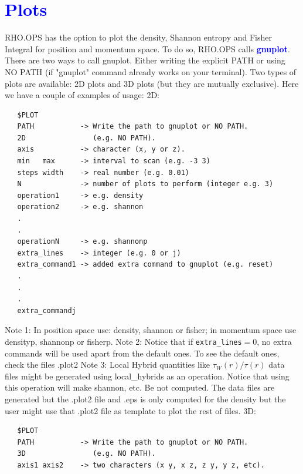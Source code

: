 \documentclass[10pt,a4paper]{article}
\newcommand{\tbl}[1]{{\textcolor{blue}{#1}}}
\begin{document}
{\section{\tbl{\textbf{Plots}}}
\noindent RHO.OPS has the option to plot the density, Shannon entropy and Fisher Integral for position and momentum space. To do so, RHO.OPS calls {\tbl{\textbf{gnuplot}}}. There are two ways to call gnuplot. Either writing the explicit PATH or using NO PATH (if "gnuplot" command already works on your terminal). Two types of plots are available: 2D plots and 3D plots (but they are mutually exclusive). Here we have a couple of examples of usage:
\newline
\newline
\noindent 2D: \newline
\begin{verbatim}
   $PLOT
   PATH           -> Write the path to gnuplot or NO PATH.
   2D                (e.g. NO PATH).
   axis           -> character (x, y or z).
   min   max      -> interval to scan (e.g. -3 3)
   steps width    -> real number (e.g. 0.01)
   N              -> number of plots to perform (integer e.g. 3)
   operation1     -> e.g. density
   operation2     -> e.g. shannon
   .
   .
   operationN     -> e.g. shannonp
   extra_lines    -> integer (e.g. 0 or j)
   extra_command1 -> added extra command to gnuplot (e.g. reset)
   .
   .
   .
   extra_commandj
\end{verbatim}
Note 1: In position space use: density, shannon or fisher; in momentum space use densityp, shannonp or fisherp. \newline
Note 2: Notice that if {\tt extra\_lines$=0$}, no extra commands will be used apart from the default ones. To see the default ones, check the files .plot2 \newline
Note 3: Local Hybrid quantities like $\tau _W (r)/\tau (r)$ data files might be generated using local\_hybrids as an operation. Notice that using this operation will make shannon, etc. Be not computed. The data files are generated but the .plot2 file and .eps is only computed for the density but the user might use that .plot2 file as template to plot the rest of files.\newline  
\newline  
\noindent 3D: \newline
\begin{verbatim}
   $PLOT
   PATH           -> Write the path to gnuplot or NO PATH.
   3D                (e.g. NO PATH).
   axis1 axis2    -> two characters (x y, x z, z y, y z, etc).

\end{verbatim}}
\end{document}
